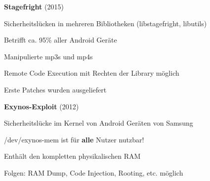 \begin{frame}
	\textbf{Stagefright} (2015)
	\begin{block}{}
		Sicherheitslücken in mehreren Bibliotheken (libstagefright, libutils)
	\end{block}		
	\begin{block}{}
		Betrifft ca. 95\% aller Android Geräte
	\end{block}
	\begin{block}{}
		Manipulierte mp3s und mp4s
	\end{block}
	\begin{block}{}
		Remote Code Execution mit Rechten der Library möglich						
	\end{block}
	\begin{block}{}
		Erste Patches wurden ausgeliefert
	\end{block}
\end{frame}
\begin{frame}
	\textbf{Exynos-Exploit} (2012)
	\begin{block}{}
		Sicherheitslücke im Kernel von Android Geräten von Samsung
	\end{block}		
	\begin{block}{}
		/dev/exynos-mem ist für \textbf{alle} Nutzer nutzbar!
	\end{block}
	\begin{block}{}
		Enthält den kompletten physikalischen RAM
	\end{block}
	\begin{block}{}
		Folgen: RAM Dump, Code Injection, Rooting, etc. möglich
	\end{block}
\end{frame}